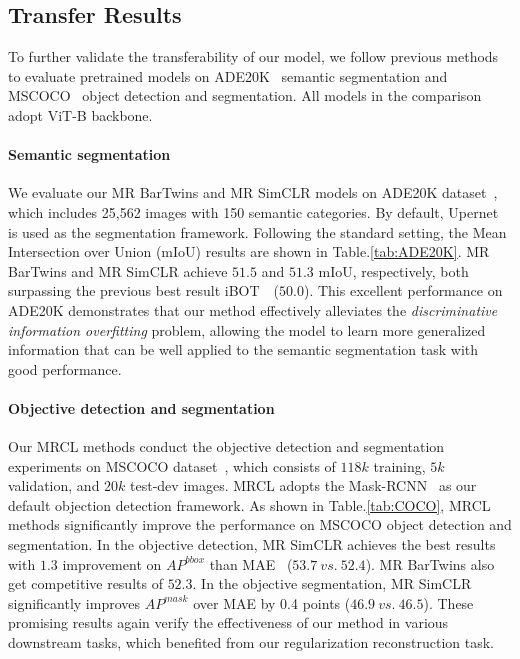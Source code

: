 \documentclass[10pt,twocolumn,letterpaper]{article}
\begin{document}
\subsection{Transfer Results}
To further validate the transferability of our model, we follow previous methods to evaluate pretrained models on ADE20K~\cite{zhou2019semantic} semantic segmentation and MSCOCO~\cite{lin2014microsoft} object detection and segmentation. All models in the comparison adopt ViT-B backbone.

\paragraph{Semantic segmentation} We evaluate our MR BarTwins and MR SimCLR models on ADE20K dataset~\cite{zhou2019semantic}, which includes 25,562 images with 150 semantic categories. By default, Upernet~\cite{xiao2018unified} is used as the segmentation framework. Following the standard setting, the Mean Intersection over Union (mIoU) results are shown in Table.\ref{tab:ADE20K}. MR BarTwins and MR SimCLR achieve $51.5$ and $51.3$ mIoU, respectively, both surpassing the previous best result iBOT~\cite{zhou2021ibot}~($50.0$). This excellent performance on ADE20K demonstrates that our method effectively alleviates the \textit{discriminative information overfitting} problem, allowing the model to learn more generalized information that can be well applied to the semantic segmentation task with good performance.
\paragraph{Objective detection and segmentation} Our MRCL methods conduct the objective detection and segmentation experiments on MSCOCO dataset~\cite{lin2014microsoft}, which consists of $118k$ training, $5k$ validation, and $20k$ test-dev images. MRCL adopts the Mask-RCNN~\cite{he2017mask} as our default objection detection framework. As shown in Table.\ref{tab:COCO}, MRCL methods significantly improve the performance on MSCOCO object detection and segmentation. In the objective detection, MR SimCLR achieves the best results with $1.3$ improvement on $AP^{bbox}$ than MAE~\cite{he2022masked} ($53.7~vs.~52.4$). MR BarTwins also get competitive results of $52.3$. In the objective segmentation, MR SimCLR significantly improves $AP^{mask}$ over MAE by 0.4 points ($46.9~vs.~46.5$). These promising results again verify the effectiveness of our method in various downstream tasks, which benefited from our regularization reconstruction task.
\end{document}
